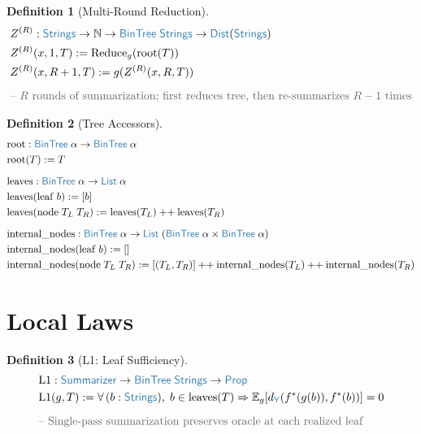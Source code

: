 \documentclass[11pt]{article}
\theoremstyle{definition}
\newtheorem{defnenv}{Definition}
\theoremstyle{plain}
\newcommand{\ty}[1]{\textcolor{type}{\mathsf{#1}}}
\newcommand{\fn}[1]{\mathrm{#1}}
\newcommand{\cmt}[1]{\textcolor{comment}{\text{-- #1}}}
\newcommand{\all}{\forall\,}
\newcommand{\arr}{\to}
\newcommand{\Arr}{\Rightarrow}
\newcommand{\defeq}{:=}
\newcommand{\Strings}{\ty{Strings}}
\newcommand{\Y}{\ty{Y}}
\newcommand{\N}{\mathbb{N}}
\newcommand{\Prop}{\ty{Prop}}
\newcommand{\Dist}[1]{\ty{Dist}(#1)}
\newcommand{\fstar}{f^*}
\newcommand{\dY}{d_{\Y}}
\newcommand{\Eg}{\mathbb{E}_g}
\newcommand{\reduce}{\fn{Reduce}_g}
\newcommand{\ZR}{Z^{(R)}}
\begin{document}
\begin{defnenv}[Multi-Round Reduction]
\label{def:multiround}
\begin{align*}
&\ZR : \Strings \arr \N \arr \ty{BinTree}\;\Strings \arr \Dist{\Strings} \\
&\ZR(x, 1, T) \defeq \reduce(\fn{root}(T)) \\
&\ZR(x, R+1, T) \defeq g(\ZR(x, R, T)) \\[6pt]
&\cmt{$R$ rounds of summarization; first reduces tree, then re-summarizes $R-1$ times}
\end{align*}
\end{defnenv}

\begin{defnenv}[Tree Accessors]
\label{def:accessors}
\begin{align*}
&\fn{root} : \ty{BinTree}\;\alpha \arr \ty{BinTree}\;\alpha \\
&\fn{root}(T) \defeq T \\[6pt]
&\fn{leaves} : \ty{BinTree}\;\alpha \arr \ty{List}\;\alpha \\
&\fn{leaves}(\fn{leaf}\; b) \defeq [b] \\
&\fn{leaves}(\fn{node}\; T_L\; T_R) \defeq \fn{leaves}(T_L) \mathbin{++} \fn{leaves}(T_R) \\[6pt]
&\fn{internal\_nodes} : \ty{BinTree}\;\alpha \arr \ty{List}\;(\ty{BinTree}\;\alpha \times \ty{BinTree}\;\alpha) \\
&\fn{internal\_nodes}(\fn{leaf}\; b) \defeq [] \\
&\fn{internal\_nodes}(\fn{node}\; T_L\; T_R) \defeq [(T_L, T_R)] \mathbin{++} \fn{internal\_nodes}(T_L) \mathbin{++} \fn{internal\_nodes}(T_R)
\end{align*}
\end{defnenv}

\section{Local Laws}
\label{sec:local_laws}

\begin{defnenv}[L1: Leaf Sufficiency]
\label{def:L1}
\begin{align*}
&\fn{L1} : \ty{Summarizer} \arr \ty{BinTree}\;\Strings \arr \Prop \\
&\fn{L1}(g, T) \defeq \all (b : \Strings),\; b \in \fn{leaves}(T) \Arr \Eg[\dY(\fstar(g(b)), \fstar(b))] = 0 \\[6pt]
&\cmt{Single-pass summarization preserves oracle at each realized leaf}
\end{align*}
\end{defnenv}
\end{document}
